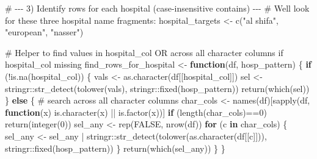 \documentclass[
  letterpaper,
  DIV=11,
  numbers=noendperiod]{scrartcl}
\newenvironment{Shaded}{\begin{snugshade}}{\end{snugshade}}
\newcommand{\CommentTok}[1]{\textcolor[rgb]{0.37,0.37,0.37}{#1}}
\newcommand{\ConstantTok}[1]{\textcolor[rgb]{0.56,0.35,0.01}{#1}}
\newcommand{\ControlFlowTok}[1]{\textcolor[rgb]{0.00,0.23,0.31}{\textbf{#1}}}
\newcommand{\DecValTok}[1]{\textcolor[rgb]{0.68,0.00,0.00}{#1}}
\newcommand{\FunctionTok}[1]{\textcolor[rgb]{0.28,0.35,0.67}{#1}}
\newcommand{\NormalTok}[1]{\textcolor[rgb]{0.00,0.23,0.31}{#1}}
\newcommand{\OtherTok}[1]{\textcolor[rgb]{0.00,0.23,0.31}{#1}}
\newcommand{\SpecialCharTok}[1]{\textcolor[rgb]{0.37,0.37,0.37}{#1}}
\newcommand{\StringTok}[1]{\textcolor[rgb]{0.13,0.47,0.30}{#1}}
\begin{document}
\begin{Shaded}
\begin{Highlighting}[]
\CommentTok{\# {-}{-}{-} 3) Identify rows for each hospital (case{-}insensitive contains) {-}{-}{-}}
\CommentTok{\# We\textquotesingle{}ll look for these three hospital name fragments:}
\NormalTok{hospital\_targets }\OtherTok{\textless{}{-}} \FunctionTok{c}\NormalTok{(}\StringTok{"al shifa"}\NormalTok{, }\StringTok{"european"}\NormalTok{, }\StringTok{"nasser"}\NormalTok{)}

\CommentTok{\# Helper to find values in hospital\_col OR across all character columns if hospital\_col missing}
\NormalTok{find\_rows\_for\_hospital }\OtherTok{\textless{}{-}} \ControlFlowTok{function}\NormalTok{(df, hosp\_pattern) \{}
  \ControlFlowTok{if}\NormalTok{ (}\SpecialCharTok{!}\FunctionTok{is.na}\NormalTok{(hospital\_col)) \{}
\NormalTok{    vals }\OtherTok{\textless{}{-}} \FunctionTok{as.character}\NormalTok{(df[[hospital\_col]])}
\NormalTok{    sel }\OtherTok{\textless{}{-}}\NormalTok{ stringr}\SpecialCharTok{::}\FunctionTok{str\_detect}\NormalTok{(}\FunctionTok{tolower}\NormalTok{(vals), stringr}\SpecialCharTok{::}\FunctionTok{fixed}\NormalTok{(hosp\_pattern))}
    \FunctionTok{return}\NormalTok{(}\FunctionTok{which}\NormalTok{(sel))}
\NormalTok{  \} }\ControlFlowTok{else}\NormalTok{ \{}
    \CommentTok{\# search across all character columns}
\NormalTok{    char\_cols }\OtherTok{\textless{}{-}} \FunctionTok{names}\NormalTok{(df)[}\FunctionTok{sapply}\NormalTok{(df, }\ControlFlowTok{function}\NormalTok{(x) }\FunctionTok{is.character}\NormalTok{(x) }\SpecialCharTok{||} \FunctionTok{is.factor}\NormalTok{(x))]}
    \ControlFlowTok{if}\NormalTok{ (}\FunctionTok{length}\NormalTok{(char\_cols)}\SpecialCharTok{==}\DecValTok{0}\NormalTok{) }\FunctionTok{return}\NormalTok{(}\FunctionTok{integer}\NormalTok{(}\DecValTok{0}\NormalTok{))}
\NormalTok{    sel\_any }\OtherTok{\textless{}{-}} \FunctionTok{rep}\NormalTok{(}\ConstantTok{FALSE}\NormalTok{, }\FunctionTok{nrow}\NormalTok{(df))}
    \ControlFlowTok{for}\NormalTok{ (c }\ControlFlowTok{in}\NormalTok{ char\_cols) \{}
\NormalTok{      sel\_any }\OtherTok{\textless{}{-}}\NormalTok{ sel\_any }\SpecialCharTok{|}\NormalTok{ stringr}\SpecialCharTok{::}\FunctionTok{str\_detect}\NormalTok{(}\FunctionTok{tolower}\NormalTok{(}\FunctionTok{as.character}\NormalTok{(df[[c]])), stringr}\SpecialCharTok{::}\FunctionTok{fixed}\NormalTok{(hosp\_pattern))}
\NormalTok{    \}}
    \FunctionTok{return}\NormalTok{(}\FunctionTok{which}\NormalTok{(sel\_any))}
\NormalTok{  \}}
\NormalTok{\}}


\end{Highlighting}
\end{Shaded}
\end{document}
